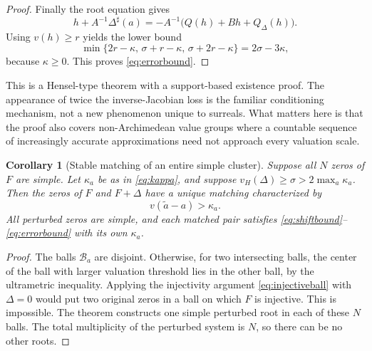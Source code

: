 \documentclass[11pt,letterpaper]{article}
\newtheorem{corollary}[theorem]{Corollary}
\theoremstyle{definition}
\theoremstyle{remark}
\newcommand{\sh}{^{\sharp}}
\numberwithin{equation}{section}
\begin{document}
\begin{proof}
Finally the root equation gives
\[
 h+A^{-1}\Delta\sh(a)=-A^{-1}\bigl(Q(h)+Bh+Q_\Delta(h)\bigr).
\]
Using $v(h)\ge r$ yields the lower bound
\[
 \min\{2r-\kappa,\,\sigma+r-\kappa,\,\sigma+2r-\kappa\}
 =2\sigma-3\kappa,
\]
because $\kappa\ge0$. This proves \eqref{eq:errorbound}.
\end{proof}

This is a Hensel-type theorem with a support-based existence proof. The appearance of twice the inverse-Jacobian loss is the familiar conditioning mechanism, not a new phenomenon unique to surreals. What matters here is that the proof also covers non-Archimedean value groups where a countable sequence of increasingly accurate approximations need not approach every valuation scale.

\begin{corollary}[Stable matching of an entire simple cluster]\label{cor:matching}
Suppose all $N$ zeros of $F$ are simple. Let $\kappa_a$ be as in \eqref{eq:kappa}, and suppose $v_H(\Delta)\ge\sigma>2\max_a\kappa_a$. Then the zeros of $F$ and $F+\Delta$ have a unique matching characterized by
\[
 v(\widetilde a-a)>\kappa_a.
\]
All perturbed zeros are simple, and each matched pair satisfies \eqref{eq:shiftbound}--\eqref{eq:errorbound} with its own $\kappa_a$.
\end{corollary}
\begin{proof}
The balls $\mathcal B_a$ are disjoint. Otherwise, for two intersecting balls, the center of the ball with larger valuation threshold lies in the other ball, by the ultrametric inequality. Applying the injectivity argument \eqref{eq:injectiveball} with $\Delta=0$ would put two original zeros in a ball on which $F$ is injective. This is impossible. The theorem constructs one simple perturbed root in each of these $N$ balls. The total multiplicity of the perturbed system is $N$, so there can be no other roots.
\end{proof}
\end{document}
